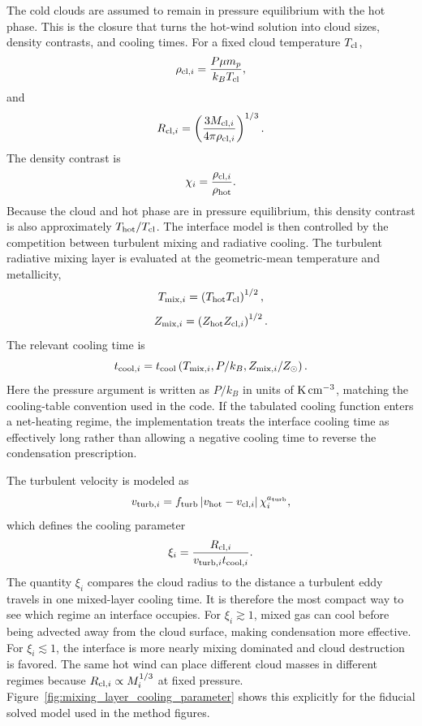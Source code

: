 The cold clouds are assumed to remain in pressure equilibrium with the hot phase.
This is the closure that turns the hot-wind solution into cloud sizes, density contrasts, and cooling times.
For a fixed cloud temperature $T_{\rm cl}$,
\begin{equation}
\rho_{{\rm cl},i}
=
\frac{P\mu m_p}{k_B T_{\rm cl}},
\end{equation}
and
\begin{equation}
R_{{\rm cl},i}
=
\left(
\frac{3M_{{\rm cl},i}}
{4\pi \rho_{{\rm cl},i}}
\right)^{1/3}.
\end{equation}
The density contrast is
\begin{equation}
\chi_i =
\frac{\rho_{{\rm cl},i}}{\rho_{\rm hot}}.
\end{equation}
Because the cloud and hot phase are in pressure equilibrium, this density contrast is also approximately $T_{\rm hot}/T_{\rm cl}$.
The interface model is then controlled by the competition between turbulent mixing and radiative cooling.
The turbulent radiative mixing layer is evaluated at the geometric-mean temperature and metallicity,
\begin{equation}
T_{{\rm mix},i}
=
\left(T_{\rm hot}T_{\rm cl}\right)^{1/2},
\end{equation}
\begin{equation}
Z_{{\rm mix},i}
=
\left(Z_{\rm hot}Z_{{\rm cl},i}\right)^{1/2}.
\end{equation}
The relevant cooling time is
\begin{equation}
t_{{\rm cool},i}
=
t_{\rm cool}
\left(T_{{\rm mix},i},P/k_B,Z_{{\rm mix},i}/Z_\odot\right).
\end{equation}
Here the pressure argument is written as $P/k_B$ in units of ${\rm K}\,{\rm cm}^{-3}$, matching the cooling-table convention used in the code.
If the tabulated cooling function enters a net-heating regime, the implementation treats the interface cooling time as effectively long rather than allowing a negative cooling time to reverse the condensation prescription.

The turbulent velocity is modeled as
\begin{equation}
v_{{\rm turb},i}
=
f_{\rm turb}
\left|v_{\rm hot}-v_{{\rm cl},i}\right|
\chi_i^{a_{\rm turb}},
\end{equation}
which defines the cooling parameter
\begin{equation}
\xi_i
=
\frac{R_{{\rm cl},i}}
{v_{{\rm turb},i}t_{{\rm cool},i}}.
\end{equation}
The quantity $\xi_i$ compares the cloud radius to the distance a turbulent eddy travels in one mixed-layer cooling time.
It is therefore the most compact way to see which regime an interface occupies.
For $\xi_i \gtrsim 1$, mixed gas can cool before being advected away from the cloud surface, making condensation more effective.
For $\xi_i \lesssim 1$, the interface is more nearly mixing dominated and cloud destruction is favored.
The same hot wind can place different cloud masses in different regimes because $R_{{\rm cl},i}\propto M_i^{1/3}$ at fixed pressure.
Figure~\ref{fig:mixing_layer_cooling_parameter} shows this explicitly for the fiducial solved model used in the method figures.

